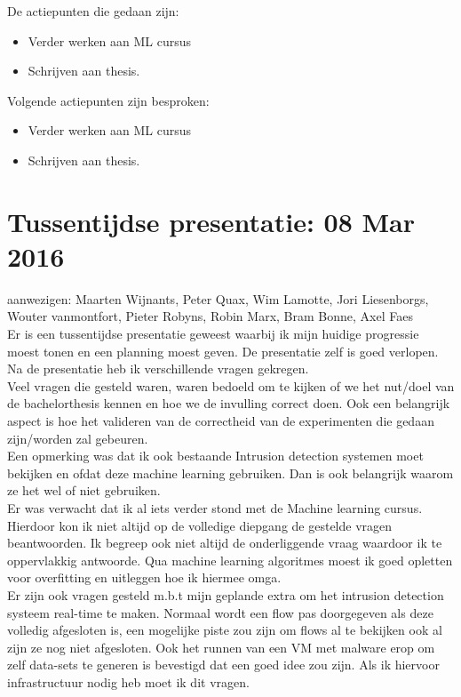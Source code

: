 \noindent De actiepunten die gedaan zijn:
\begin{itemize}  
		\item Verder werken aan ML cursus
        \item Schrijven aan thesis.
\end{itemize}

\noindent Volgende actiepunten zijn besproken:
\begin{itemize}  		
\item Verder werken aan ML cursus
        \item Schrijven aan thesis.
\end{itemize}

\section{Tussentijdse presentatie: 08 Mar 2016}
aanwezigen: Maarten Wijnants, Peter Quax, Wim Lamotte, Jori Liesenborgs, Wouter vanmontfort, Pieter Robyns, Robin Marx, Bram Bonne, Axel Faes\\

\noindent Er is een tussentijdse presentatie geweest waarbij ik mijn huidige progressie moest tonen en een planning moest geven. De presentatie zelf is goed verlopen. Na de presentatie heb ik verschillende vragen gekregen. \\

\noindent Veel vragen die gesteld waren, waren bedoeld om te kijken of we het nut/doel van de bachelorthesis kennen en hoe we de invulling correct doen. Ook een belangrijk aspect is hoe het valideren van de correctheid van de experimenten die gedaan zijn/worden zal gebeuren. \\

\noindent Een opmerking was dat ik ook bestaande Intrusion detection systemen moet bekijken en ofdat deze machine learning gebruiken. Dan is ook belangrijk waarom ze het wel of niet gebruiken. \\

\noindent Er was verwacht dat ik al iets verder stond met de Machine learning cursus. Hierdoor kon ik niet altijd op de volledige diepgang de gestelde vragen beantwoorden. Ik begreep ook niet altijd de onderliggende vraag waardoor ik te oppervlakkig antwoorde. Qua machine learning algoritmes moest ik goed opletten voor overfitting en uitleggen hoe ik hiermee omga.\\

\noindent Er zijn ook vragen gesteld m.b.t mijn geplande extra om het intrusion detection systeem real-time te maken. Normaal wordt een flow pas doorgegeven als deze volledig afgesloten is, een mogelijke piste zou zijn om flows al te bekijken ook al zijn ze nog niet afgesloten. Ook het runnen van een VM met malware erop om zelf data-sets te generen is bevestigd dat een goed idee zou zijn. Als ik hiervoor infrastructuur nodig heb moet ik dit vragen.\\

